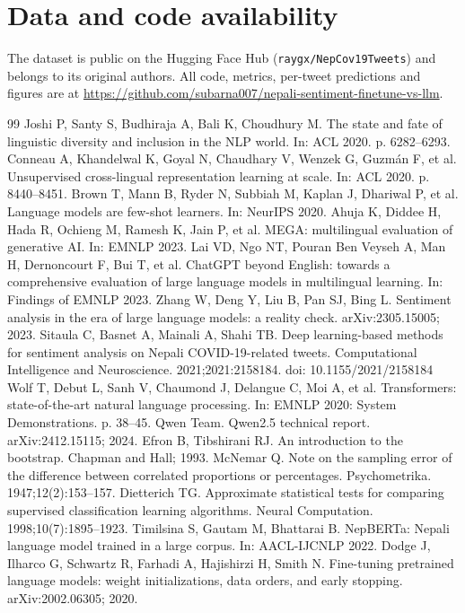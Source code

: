 \documentclass[11pt,a4paper]{article}
\begin{document}
\section*{Data and code availability}
The dataset is public on the Hugging Face Hub (\texttt{raygx/NepCov19Tweets}) and belongs to its original authors. All code, metrics, per-tweet predictions and figures are at \url{https://github.com/subarna007/nepali-sentiment-finetune-vs-llm}.

\begin{thebibliography}{99}\small
{} Joshi P, Santy S, Budhiraja A, Bali K, Choudhury M. The state and fate of linguistic diversity and inclusion in the NLP world. In: ACL 2020. p. 6282--6293.
 Conneau A, Khandelwal K, Goyal N, Chaudhary V, Wenzek G, Guzm\'an F, et al. Unsupervised cross-lingual representation learning at scale. In: ACL 2020. p. 8440--8451.
 Brown T, Mann B, Ryder N, Subbiah M, Kaplan J, Dhariwal P, et al. Language models are few-shot learners. In: NeurIPS 2020.
 Ahuja K, Diddee H, Hada R, Ochieng M, Ramesh K, Jain P, et al. MEGA: multilingual evaluation of generative AI. In: EMNLP 2023.
 Lai VD, Ngo NT, Pouran Ben Veyseh A, Man H, Dernoncourt F, Bui T, et al. ChatGPT beyond English: towards a comprehensive evaluation of large language models in multilingual learning. In: Findings of EMNLP 2023.
 Zhang W, Deng Y, Liu B, Pan SJ, Bing L. Sentiment analysis in the era of large language models: a reality check. arXiv:2305.15005; 2023.
 Sitaula C, Basnet A, Mainali A, Shahi TB. Deep learning-based methods for sentiment analysis on Nepali COVID-19-related tweets. Computational Intelligence and Neuroscience. 2021;2021:2158184. doi: 10.1155/2021/2158184
 Wolf T, Debut L, Sanh V, Chaumond J, Delangue C, Moi A, et al. Transformers: state-of-the-art natural language processing. In: EMNLP 2020: System Demonstrations. p. 38--45.
 Qwen Team. Qwen2.5 technical report. arXiv:2412.15115; 2024.
 Efron B, Tibshirani RJ. An introduction to the bootstrap. Chapman and Hall; 1993.
 McNemar Q. Note on the sampling error of the difference between correlated proportions or percentages. Psychometrika. 1947;12(2):153--157.
 Dietterich TG. Approximate statistical tests for comparing supervised classification learning algorithms. Neural Computation. 1998;10(7):1895--1923.
 Timilsina S, Gautam M, Bhattarai B. NepBERTa: Nepali language model trained in a large corpus. In: AACL-IJCNLP 2022.
 Dodge J, Ilharco G, Schwartz R, Farhadi A, Hajishirzi H, Smith N. Fine-tuning pretrained language models: weight initializations, data orders, and early stopping. arXiv:2002.06305; 2020.
\end{thebibliography}
\end{document}
